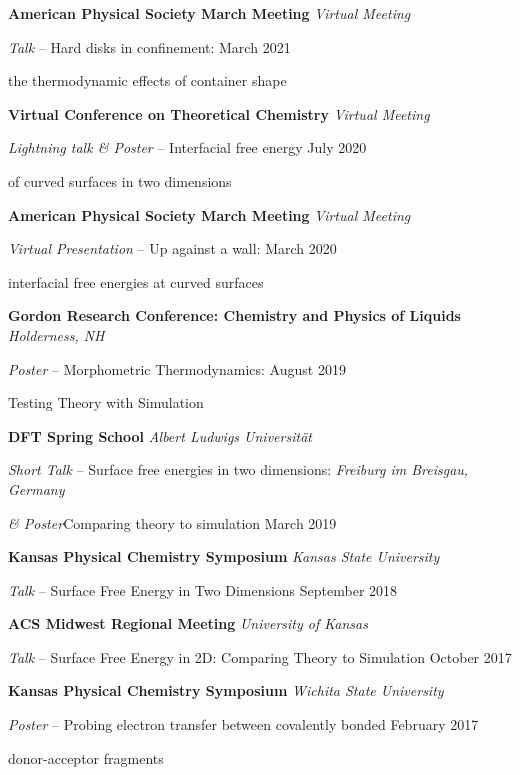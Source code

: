 {\bf American Physical Society March Meeting} \hfill \textit{Virtual Meeting}

\textit{Talk} -- Hard disks in confinement:  \hfill March 2021

\qquad\qquad\quad the thermodynamic effects of container shape

\vspace{\y}
{\bf Virtual Conference on Theoretical Chemistry} \hfill \textit{Virtual Meeting}

\textit{Lightning talk \& Poster} -- Interfacial free energy \hfill July 2020

\qquad\qquad\quad of curved surfaces in two dimensions

\vspace{\y}
{\bf American Physical Society March Meeting} \hfill \textit{Virtual Meeting}

\textit{Virtual Presentation} -- Up against a wall:  \hfill March 2020

\qquad\qquad\quad interfacial free energies at curved surfaces

\vspace{\y}
{\bf Gordon Research Conference: Chemistry and Physics of Liquids} \hfill \textit{Holderness, NH}

\textit{Poster} -- Morphometric Thermodynamics: \hfill August 2019

\qquad\qquad\quad Testing Theory with Simulation

\vspace{\y}
{\bf DFT Spring School} \hfill \textit{Albert Ludwigs Universit{\"a}t}

\textit{Short Talk} -- Surface free energies in two dimensions:
\hfill \textit{Freiburg im Breisgau, Germany}

\quad \textit{\& Poster}\qquad Comparing theory to simulation \hfill March 2019

\vspace{\y}
{\bf Kansas Physical Chemistry Symposium} \hfill \textit{Kansas State University}

\textit{Talk} -- Surface Free Energy in Two Dimensions \hfill September 2018

\vspace{\y}
{\bf ACS Midwest Regional Meeting} \hfill \textit{University of Kansas}

\textit{Talk} -- Surface Free Energy in 2D: Comparing Theory to Simulation \hfill October 2017

\vspace{\y}
{\bf Kansas Physical Chemistry Symposium} \hfill \textit{Wichita State University}

\textit{Poster} --  Probing electron transfer between covalently bonded \hfill February 2017

\qquad\qquad\quad donor-acceptor fragments